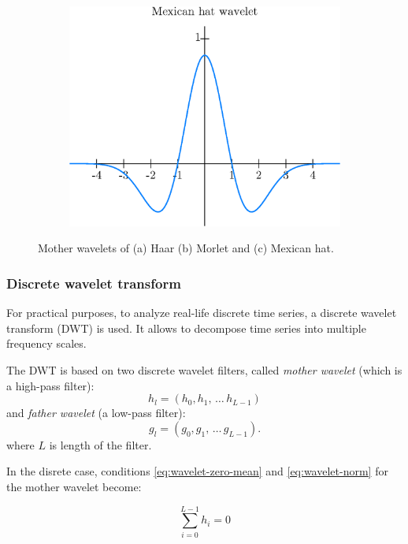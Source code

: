 \begin{figure}[h]
\begin{subfigure}{\minipagewidth}
		\centering
		\includegraphics[width=\textwidth]{figures/mexican.eps}
		\caption{}
	\end{subfigure}
	\caption{Mother wavelets of (a) Haar (b) Morlet and (c) Mexican hat.}
	\label{fig:wavelets}
\end{figure}

\subsubsection{Discrete wavelet transform}
For practical purposes, to analyze real-life discrete time series, a discrete wavelet transform (DWT) is used.
It allows to decompose time series into multiple frequency scales.

The DWT is based on two discrete wavelet filters, called \emph{mother wavelet}
(which is a high-pass filter):
\begin{equation}
h_l=(h_0, h_1, \, \ldots \, h_{L-1})
\end{equation}
and \emph{father wavelet} (a low-pass filter):
\begin{equation}
g_l=(g_0, g_1, \, \ldots \, g_{L-1}).
\end{equation}
where $L$ is length of the filter.

In the disrete case, conditions \ref{eq:wavelet-zero-mean} and \ref{eq:wavelet-norm} for the mother wavelet become:

\begin{equation}
	\sum_{i=0}^{L-1} h_i = 0
\end{equation}

